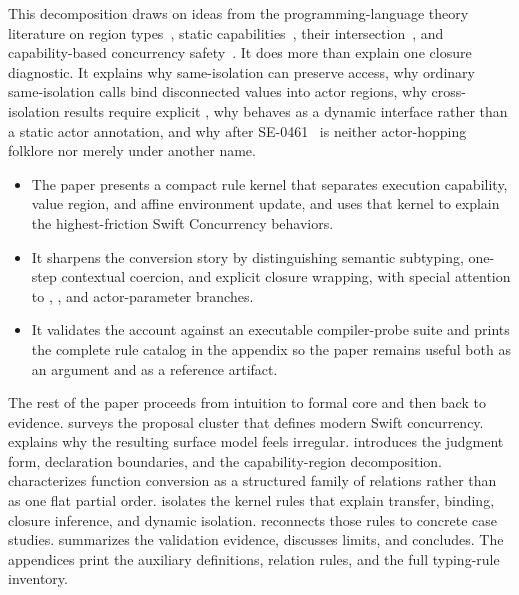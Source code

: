 This decomposition draws on ideas from the programming-language theory literature on region types~\cite{tofte1997region,grossman2002cyclone}, static capabilities~\cite{walker2000capabilities,chargueraud2008capabilities}, their intersection~\cite{walker2001regions}, and capability-based concurrency safety~\cite{milano2022fearless}. It does more than explain one closure diagnostic. It explains why same-isolation  can preserve access, why ordinary same-isolation calls bind disconnected values into actor regions, why cross-isolation results require explicit , why  behaves as a dynamic interface rather than a static actor annotation, and why  after SE-0461~\cite{se0461} is neither actor-hopping folklore nor merely  under another name.

\begin{contributionbox}
\begin{itemize}
  \item The paper presents a compact rule kernel that separates execution capability, value region, and affine environment update, and uses that kernel to explain the highest-friction Swift Concurrency behaviors.
  \item It sharpens the conversion story by distinguishing semantic subtyping, one-step contextual coercion, and explicit closure wrapping, with special attention to , , and  actor-parameter branches.
  \item It validates the account against an executable compiler-probe suite and prints the complete rule catalog in the appendix so the paper remains useful both as an argument and as a reference artifact.
\end{itemize}
\end{contributionbox}

The rest of the paper proceeds from intuition to formal core and then back to evidence.  surveys the proposal cluster that defines modern Swift concurrency.  explains why the resulting surface model feels irregular.  introduces the judgment form, declaration boundaries, and the capability-region decomposition.  characterizes function conversion as a structured family of relations rather than as one flat partial order.  isolates the kernel rules that explain transfer, binding, closure inference, and dynamic isolation.  reconnects those rules to concrete case studies.  summarizes the validation evidence,  discusses limits, and  concludes. The appendices print the auxiliary definitions, relation rules, and the full typing-rule inventory.
